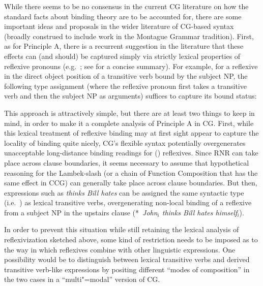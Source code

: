 \documentclass[output=paper
                ,modfonts
 	        ,biblatex
                ,babelshorthands
                ,newtxmath
                ,draftmode
                ,colorlinks, citecolor=brown
]{langscibook}
\begin{document}
While there seems to be no consensus in the current CG literature on
how the standard
facts about binding theory are to be accounted for, there are
some important ideas and proposals in the wider literature of CG-based
syntax (broadly construed to include work in the Montague Grammar
tradition). First, as for Principle A, there is a recurrent suggestion
in the literature that these effects can (and should) be captured
simply via strictly lexical properties of reflexive pronouns
(e.g.\ \citealt{keenan88binding,szabolcsi1992}; see \citealt[43--44]{buringbinding} for a concise summary).
For example, for a reflexive in the direct object position
of a transitive verb bound by the subject NP,
the following type assignment (where the reflexive pronoun first takes
a transitive verb and then the subject NP as arguments) suffices to
capture its bound status:

\begin{exe}
 \ex\label{SELF}
        {}
        {}
\end{exe}

\noindent
This approach is attractively simple, but there are at least two
things to keep in mind, in order to make it a complete analysis of
Principle A in CG. First, while this 
lexical treatment of reflexive binding may at first sight 
appear to capture the locality of binding quite nicely, CG's flexible
syntax potentially overgenerates unacceptable long-distance binding
readings for () reflexives. Since RNR can take
place across clause boundaries,  it seems necessary to
assume that hypothetical reasoning for the Lambek-slash
(or a chain of Function Composition that has the same effect in CCG)
can generally take place across clause boundaries. But then,
expressions such as \textit{thinks Bill hates} can be assigned
the same syntactic type (i.e.\  ) as lexical transitive verbs,
overgenerating non-local binding of a reflexive from a subject NP in
the upstairs clause (*~\textit{John\ensuremath{_i} thinks Bill hates {himself\ensuremath{_i}}}).

In order to prevent this situation while still retaining the lexical
analysis of reflexivization sketched above, some kind of restriction
needs to be imposed as to the way in which reflexives combine with
other linguistic expressions. One possibility would be to distinguish
between lexical transitive verbs and derived transitive verb-like
expressions by positing different ``modes of composition'' in the two
cases in a ``multi"=modal'' version of CG.
\end{document}
